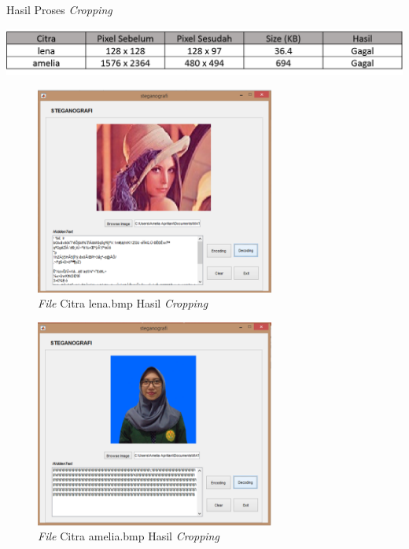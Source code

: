	\begin{table}[H]
		\centering
		\caption{Hasil Proses \emph{Cropping} }
		\includegraphics[width=1.0\textwidth]{gambar/table_cropping}
		\label{tabel_cropping}
	\end{table}

	\begin{figure}[H]
		\centering
		\includegraphics[width=0.7\textwidth]{gambar/matlab/lena_crop}
		\caption{\emph{File} Citra lena.bmp Hasil \emph{Cropping}}
		\label{lena_crop}
	\end{figure}

	\begin{figure}[H]
		\centering
		\includegraphics[width=0.7\textwidth]{gambar/matlab/amelia_crop}
		\caption{\emph{File} Citra amelia.bmp Hasil \emph{Cropping}}
		\label{amelia_crop}
	\end{figure}


